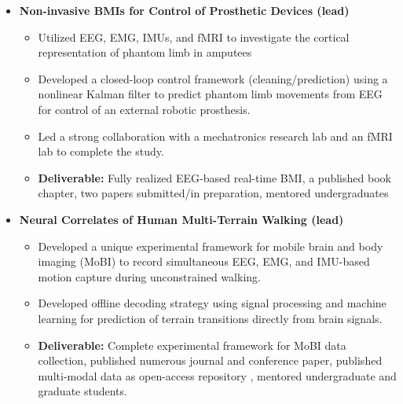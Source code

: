 \begin{adjustwidth}{0.5em}{0pt}
    \begin{itemize}
    \item[\color{accent}\ding{224}] {\color{emphasis}\textbf{Non-invasive BMIs for Control of Prosthetic Devices (lead) \hfill {}}}\\
    \smallskip
        \begin{itemize}
            \item Utilized EEG, EMG, IMUs, and fMRI to investigate the cortical representation of phantom limb in amputees 
            \item Developed a closed-loop control framework (cleaning/prediction) using a nonlinear Kalman filter to predict phantom limb movements from EEG for control of an external robotic prosthesis. 
            \item Led a strong collaboration with a mechatronics research lab and an fMRI lab to complete the study. 
            \item {\color{pink} \textbf{Deliverable:}} Fully realized EEG-based real-time BMI, a published book chapter, two papers submitted/in preparation, mentored undergraduates
        \end{itemize}
    \medskip    
    
    \item[\color{accent}\ding{224}] {\color{emphasis}\textbf{Neural Correlates of Human Multi-Terrain Walking (lead) \hfill {}}}\\
    \smallskip
        \begin{itemize}
            \item Developed a unique experimental framework for mobile brain and body imaging (MoBI) to record simultaneous EEG, EMG, and IMU-based motion capture during unconstrained walking.
            \item Developed offline decoding strategy using signal processing and machine learning for prediction of terrain transitions directly from brain signals.
            \item {\color{pink} \textbf{Deliverable:}} Complete experimental framework for MoBI data collection, published numerous journal and conference paper, published multi-modal data as open-access repository \href{https://figshare.com/articles/EEG_Data/5616109/5}{\faFloppyO}, mentored undergraduate and graduate students.
        \end{itemize}
    \medskip   
    

\end{itemize}
\end{adjustwidth}
